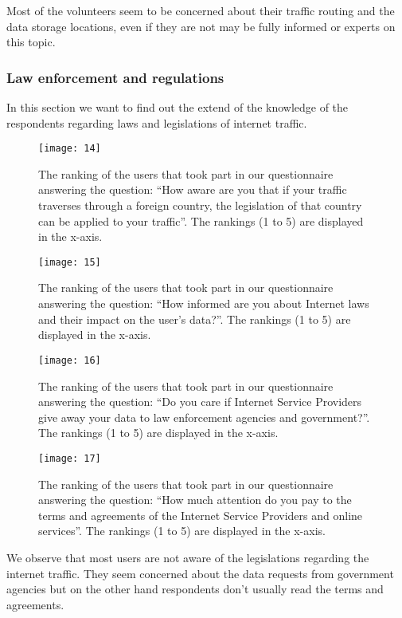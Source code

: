Most of the volunteers  seem to be concerned about their traffic routing and the 
data  storage locations, even if they are not may be fully informed or experts 
on this topic. 

\subsubsection{Law enforcement and regulations}

In this section we want to find out the extend of the knowledge of the 
respondents regarding laws and legislations of internet traffic.

\begin{figure}[hp]
\centering
\texttt{[image: 14]}
\caption{The ranking of the users that took part in our questionnaire answering
the question: ``How aware are you that if your traffic traverses through a 
foreign country, the legislation of that country can be applied to your 
traffic''. The rankings (1 to 5) are displayed in the x-axis.}
\end{figure}

\begin{figure}[hp]
\centering
\texttt{[image: 15]}
\caption{The ranking of the users that took part in our questionnaire answering
the question: ``How informed are you about Internet laws and their impact on the 
user's data?''. The rankings (1 to 5) are displayed in the x-axis.}
\end{figure}

\begin{figure}[hp]
\centering
\texttt{[image: 16]}
\caption{The ranking of the users that took part in our questionnaire answering
the question: ``Do you care if Internet Service Providers give away your data to 
law enforcement agencies and government?''. The
rankings (1 to 5) are displayed in the x-axis.}
\end{figure}

\begin{figure}[hp]
\centering
\texttt{[image: 17]}
\caption{The ranking of the users that took part in our questionnaire answering
the question: ``How much attention do you pay to the terms and agreements of the 
Internet Service Providers and online services''. The rankings (1 to 5) are 
displayed in the x-axis.}
\end{figure}

We observe that most users are not aware of the legislations regarding the 
internet traffic. They seem concerned about the data requests from government 
agencies but on the other hand respondents don't usually read the terms and 
agreements.

